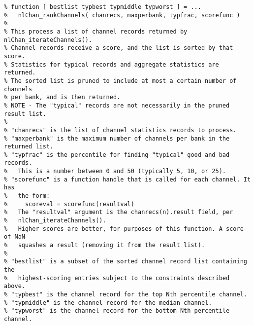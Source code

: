 \begin{verbatim}
% function [ bestlist typbest typmiddle typworst ] = ...
%   nlChan_rankChannels( chanrecs, maxperbank, typfrac, scorefunc )
%
% This process a list of channel records returned by nlChan_iterateChannels().
% Channel records receive a score, and the list is sorted by that score.
% Statistics for typical records and aggregate statistics are returned.
% The sorted list is pruned to include at most a certain number of channels
% per bank, and is then returned.
% NOTE - The "typical" records are not necessarily in the pruned result list.
%
% "chanrecs" is the list of channel statistics records to process.
% "maxperbank" is the maximum number of channels per bank in the returned list.
% "typfrac" is the percentile for finding "typical" good and bad records.
%   This is a number between 0 and 50 (typically 5, 10, or 25).
% "scorefunc" is a function handle that is called for each channel. It has
%   the form:
%     scoreval = scorefunc(resultval)
%   The "resultval" argument is the chanrecs(n).result field, per
%   nlChan_iterateChannels().
%   Higher scores are better, for purposes of this function. A score of NaN
%   squashes a result (removing it from the result list).
%
% "bestlist" is a subset of the sorted channel record list containing the
%   highest-scoring entries subject to the constraints described above.
% "typbest" is the channel record for the top Nth percentile channel.
% "typmiddle" is the channel record for the median channel.
% "typworst" is the channel record for the bottom Nth percentile channel.
\end{verbatim}

